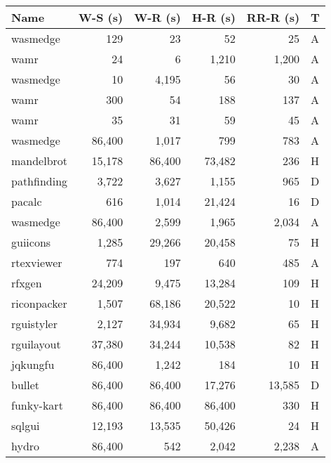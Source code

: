 \begin{tabular}{lrrrrl}
\hline
 Name            &   W-S (s) &   W-R (s) &   H-R (s) &   RR-R (s) & T   \\
\hline
 wasmedge#3018   &       129 &        23 &        52 &         25 & A   \\
 wamr#2789       &        24 &         6 &     1,210 &      1,200 & A   \\
 wasmedge#3019   &        10 &     4,195 &        56 &         30 & A   \\
 wamr#2862       &       300 &        54 &       188 &        137 & A   \\
 wamr#2450       &        35 &        31 &        59 &         45 & A   \\
 wasmedge#3076   &    86,400 &     1,017 &       799 &        783 & A   \\
 mandelbrot      &    15,178 &    86,400 &    73,482 &        236 & H   \\
 pathfinding     &     3,722 &     3,627 &     1,155 &        965 & D   \\
 pacalc          &       616 &     1,014 &    21,424 &         16 & D   \\
 wasmedge#3057   &    86,400 &     2,599 &     1,965 &      2,034 & A   \\
 guiicons        &     1,285 &    29,266 &    20,458 &         75 & H   \\
 rtexviewer      &       774 &       197 &       640 &        485 & A   \\
 rfxgen          &    24,209 &     9,475 &    13,284 &        109 & H   \\
 riconpacker     &     1,507 &    68,186 &    20,522 &         10 & H   \\
 rguistyler      &     2,127 &    34,934 &     9,682 &         65 & H   \\
 rguilayout      &    37,380 &    34,244 &    10,538 &         82 & H   \\
 jqkungfu        &    86,400 &     1,242 &       184 &         10 & H   \\
 bullet          &    86,400 &    86,400 &    17,276 &     13,585 & D   \\
 funky-kart      &    86,400 &    86,400 &    86,400 &        330 & H   \\
 sqlgui          &    12,193 &    13,535 &    50,426 &         24 & H   \\
 hydro           &    86,400 &       542 &     2,042 &      2,238 & A   \\

\end{tabular}
